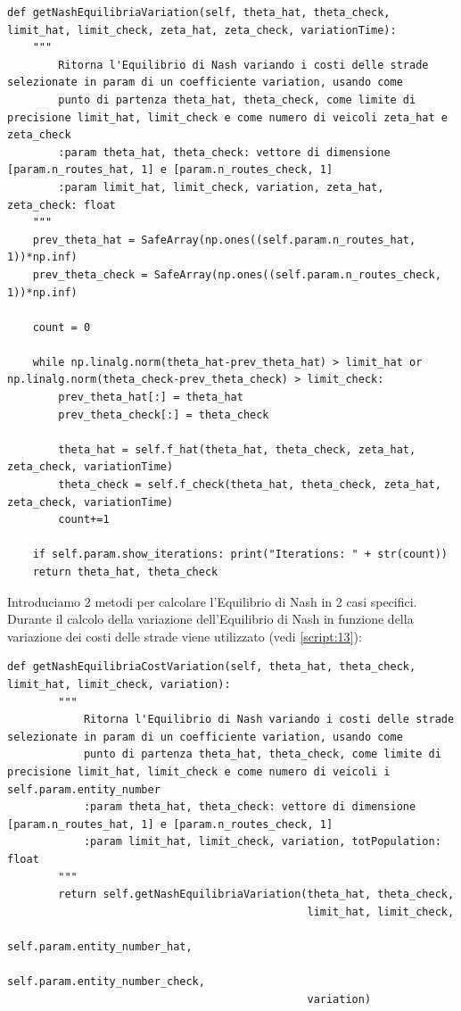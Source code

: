 \begin{lstlisting}[style=myStile, caption={Computer::getNashEquilibriaVariation}, label={script:9}]
def getNashEquilibriaVariation(self, theta_hat, theta_check, limit_hat, limit_check, zeta_hat, zeta_check, variationTime):
    """
        Ritorna l'Equilibrio di Nash variando i costi delle strade selezionate in param di un coefficiente variation, usando come
        punto di partenza theta_hat, theta_check, come limite di precisione limit_hat, limit_check e come numero di veicoli zeta_hat e zeta_check
        :param theta_hat, theta_check: vettore di dimensione [param.n_routes_hat, 1] e [param.n_routes_check, 1]
        :param limit_hat, limit_check, variation, zeta_hat, zeta_check: float
    """
    prev_theta_hat = SafeArray(np.ones((self.param.n_routes_hat, 1))*np.inf)
    prev_theta_check = SafeArray(np.ones((self.param.n_routes_check, 1))*np.inf)
    
    count = 0
    
    while np.linalg.norm(theta_hat-prev_theta_hat) > limit_hat or np.linalg.norm(theta_check-prev_theta_check) > limit_check:
        prev_theta_hat[:] = theta_hat
        prev_theta_check[:] = theta_check
        
        theta_hat = self.f_hat(theta_hat, theta_check, zeta_hat, zeta_check, variationTime)
        theta_check = self.f_check(theta_hat, theta_check, zeta_hat, zeta_check, variationTime)
        count+=1
    
    if self.param.show_iterations: print("Iterations: " + str(count))
    return theta_hat, theta_check
\end{lstlisting}

Introduciamo 2 metodi per calcolare l'Equilibrio di Nash in 2 casi specifici.
Durante il calcolo della variazione dell'Equilibrio di Nash in funzione della variazione dei costi delle strade viene utilizzato (vedi \autoref{script:13}):
\begin{lstlisting}[style=myStile, caption={Computer::getNashEquilibriaCostVariation}, label={script:15}]
    def getNashEquilibriaCostVariation(self, theta_hat, theta_check, limit_hat, limit_check, variation):
        """
            Ritorna l'Equilibrio di Nash variando i costi delle strade selezionate in param di un coefficiente variation, usando come
            punto di partenza theta_hat, theta_check, come limite di precisione limit_hat, limit_check e come numero di veicoli i self.param.entity_number
            :param theta_hat, theta_check: vettore di dimensione [param.n_routes_hat, 1] e [param.n_routes_check, 1]
            :param limit_hat, limit_check, variation, totPopulation: float
        """
        return self.getNashEquilibriaVariation(theta_hat, theta_check, 
                                               limit_hat, limit_check, 
                                               self.param.entity_number_hat, 
                                               self.param.entity_number_check, 
                                               variation)
\end{lstlisting}

